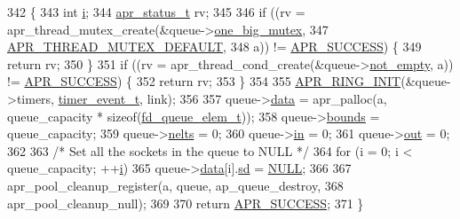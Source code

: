 \begin{DoxyCode}
342 \{
343     \textcolor{keywordtype}{int} \hyperlink{group__MOD__PROXY_ga38403a0592eb8018a3ad61aef0f7ca2c}{i};
344     \hyperlink{group__apr__errno_gaa5105fa83cc322f09382292db8b47593}{apr\_status\_t} rv;
345 
346     \textcolor{keywordflow}{if} ((rv = apr\_thread\_mutex\_create(&queue->\hyperlink{structfd__queue__t_af029904f6cc5ddc0afec5df2fadeaef6}{one\_big\_mutex},
347                                       \hyperlink{group__apr__thread__mutex_ga579050872f9aff06e773b084264f7d06}{APR\_THREAD\_MUTEX\_DEFAULT},
348                                       a)) != \hyperlink{group__apr__errno_ga9ee311b7bf1c691dc521d721339ee2a6}{APR\_SUCCESS}) \{
349         \textcolor{keywordflow}{return} rv;
350     \}
351     \textcolor{keywordflow}{if} ((rv = apr\_thread\_cond\_create(&queue->\hyperlink{structfd__queue__t_a18ddd6a916b50d00310ee4ed096a562a}{not\_empty}, a)) != 
      \hyperlink{group__apr__errno_ga9ee311b7bf1c691dc521d721339ee2a6}{APR\_SUCCESS}) \{
352         \textcolor{keywordflow}{return} rv;
353     \}
354 
355     \hyperlink{group__apr__ring_ga245e1a73b162a4a68ebd54c84683729d}{APR\_RING\_INIT}(&queue->timers, \hyperlink{structtimer__event__t}{timer\_event\_t}, link);
356 
357     queue->\hyperlink{structfd__queue__t_af838c3af6ffee37b30bbe8c45e05292b}{data} = apr\_palloc(a, queue\_capacity * \textcolor{keyword}{sizeof}(\hyperlink{structfd__queue__elem__t}{fd\_queue\_elem\_t}));
358     queue->\hyperlink{structfd__queue__t_a4f4edbb981e4bbbc7304ba485b519c09}{bounds} = queue\_capacity;
359     queue->\hyperlink{structfd__queue__t_a064707a5e5c88ee4715ebc0f4ea4abb1}{nelts} = 0;
360     queue->\hyperlink{structfd__queue__t_a17cde346fb215a61f7b2df26970c72bd}{in} = 0;
361     queue->\hyperlink{structfd__queue__t_a85b9339d9c70a03d3ff95ae92061cf70}{out} = 0;
362 
363     \textcolor{comment}{/* Set all the sockets in the queue to NULL */}
364     \textcolor{keywordflow}{for} (i = 0; i < queue\_capacity; ++\hyperlink{group__MOD__PROXY_ga38403a0592eb8018a3ad61aef0f7ca2c}{i})
365         queue->\hyperlink{structfd__queue__t_af838c3af6ffee37b30bbe8c45e05292b}{data}[i].\hyperlink{structfd__queue__elem__t_a04934612aa0f85b323659d652bc061a5}{sd} = \hyperlink{pcre_8txt_ad7f989d16aa8ca809a36bc392c07fba1}{NULL};
366 
367     apr\_pool\_cleanup\_register(a, queue, ap\_queue\_destroy,
368                               apr\_pool\_cleanup\_null);
369 
370     \textcolor{keywordflow}{return} \hyperlink{group__apr__errno_ga9ee311b7bf1c691dc521d721339ee2a6}{APR\_SUCCESS};
371 \}
\end{DoxyCode}
